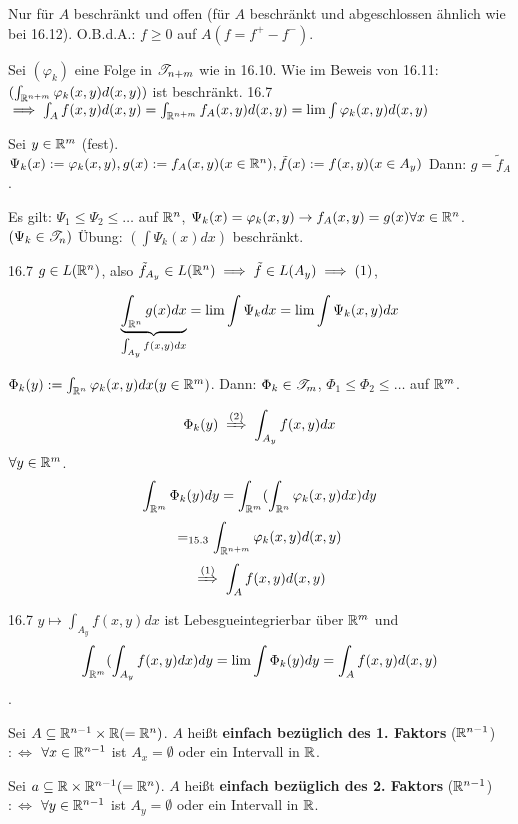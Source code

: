 \documentclass[a4paper,twoside,DIV15,BCOR12mm]{scrbook}
\begin{document}
\begin{beweis}

Nur für $A$ beschränkt und offen (für $A$ beschränkt und abgeschlossen ähnlich
wie bei 16.12). O.B.d.A.: $f \geq 0$ auf $A (f = f^{+} - f^{-})$.

\begin{liste}

\item Sei $(\varphi_k)$ eine Folge in $\mathscr{T}_{n+m}$ wie in 16.10.
Wie im Beweis von 16.11: $(\int_{\mathbb{R}^{n+m}}\varphi_k (x,y)d(x,y))$ ist beschränkt.
16.7 $\implies \int_A f(x,y) d(x,y) = \int_{\mathbb{R}^{n+m}} f_A(x,y)d(x,y) = \lim \int \varphi_k (x,y)d(x,y)$

\item Sei $y\in\mathbb{R}^m$ (fest). $\Psi_k(x):=\varphi_k(x,y), g(x):=f_A(x,y) (x\in\mathbb{R}^n), \tilde f(x):=f(x,y) (x \in A_y)$
Dann: $g = \tilde f_A$.

Es gilt: $\Psi_1 \leq \Psi_2 \leq \ldots$ auf $\mathbb{R}^n$, $\Psi_k(x)=\varphi_k(x,y) \rightarrow f_A(x,y) = g(x) \forall x\in\mathbb{R}^n$. $(\Psi_k \in \mathscr{T}_n)$ Übung: $(\int \Psi_k(x)dx)$ beschränkt.

16.7 \folgt $g\in L(\mathbb{R}^n)$, also $\tilde f_{A_y} \in L(\mathbb{R}^n) \implies \tilde f \in L(A_y) \implies (1)$,

\[\underbrace{\int_{\mathbb{R}^n} g(x)dx}_{\int_{A_y} f(x,y) dx} = \lim \int \Psi_k dx = \lim \int \Psi_k (x,y)dx\]

\item $\Phi_k(y):= \int_{\mathbb{R}^n} \varphi_k(x,y)dx (y\in\mathbb{R}^m)$. Dann: $\Phi_k\in\mathscr{T}_m$,
$\Phi_1 \leq \Phi_2 \leq \ldots$ auf $\mathbb{R}^m$.

\[\Phi_k(y) \folgtnach{(2)} \int_{A_y} f(x,y)dx\] $\forall y\in\mathbb{R}^m$.
\[\int_{\mathbb{R}^m} \Phi_k (y)dy = \int_{\mathbb{R}^m} ( \int_{\mathbb{R}^n} \varphi_k (x,y)dx)dy\]
\[=_{15.3} \int_{\mathbb{R}^{n+m}} \varphi_k (x,y)d(x,y)\]
\[ \folgtnach{(1)} \int_A f(x,y)d(x,y)\]

16.7 \folgt $y \mapsto \int_{A_y} f(x,y)dx$ ist Lebesgueintegrierbar über $\mathbb{R}^m$ und
\[\int_{\mathbb{R}^m}(\int_{A_y} f(x,y)dx)dy = \lim \int \Phi_k(y)dy = \int_A f(x,y)d(x,y)\].

\end{liste}

\end{beweis}

\begin{definition}
Sei $A\subseteq\mathbb{R}^{n-1}\times\mathbb{R} (=\mathbb{R}^n)$. $A$ heißt \textbf{einfach
bezüglich des 1. Faktors}
($\mathbb{R}^{n-1}$) $:\Leftrightarrow$ $\forall x \in \mathbb{R}^{n-1}$ ist $A_x =
\emptyset$ oder ein Intervall in $\mathbb{R}$.

Sei $a\subseteq\mathbb{R}\times\mathbb{R}^{n-1} (=\mathbb{R}^n)$. $A$ heißt \textbf{einfach
bezüglich des 2. Faktors} ($\mathbb{R}^{n-1}$) $:\Leftrightarrow$ $\forall y \in
\mathbb{R}^{n-1}$ ist $A_y = \emptyset$ oder ein Intervall in $\mathbb{R}$.
\end{definition}
\end{document}
